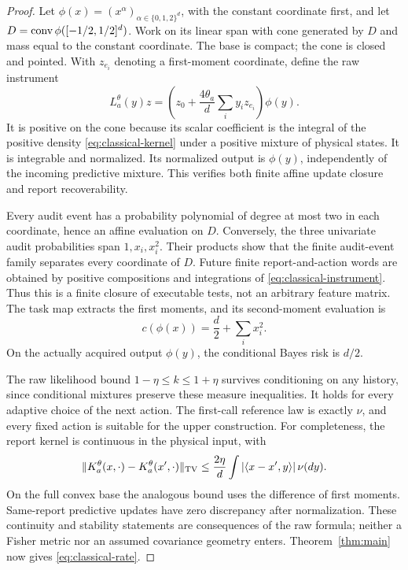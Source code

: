 \begin{proof}
Let $\phi(x)=(x^\alpha)_{\alpha\in\{0,1,2\}^d}$, with the constant coordinate first, and let $D=\operatorname{conv}\phi([-1/2,1/2]^d)$. Work on its linear span with cone generated by $D$ and mass equal to the constant coordinate. The base is compact; the cone is closed and pointed. With $z_{e_i}$ denoting a first-moment coordinate, define the raw instrument
\begin{equation}\label{eq:classical-instrument}
 L_a^\theta(y)z=
   \left(z_0+\frac{4\theta_a}{d}\sum_i y_i z_{e_i}\right)\phi(y).
\end{equation}
It is positive on the cone because its scalar coefficient is the integral of the positive density \eqref{eq:classical-kernel} under a positive mixture of physical states. It is integrable and normalized. Its normalized output is $\phi(y)$, independently of the incoming predictive mixture. This verifies both finite affine update closure and report recoverability.

Every audit event has a probability polynomial of degree at most two in each coordinate, hence an affine evaluation on $D$. Conversely, the three univariate audit probabilities span $1,x_i,x_i^2$. Their products show that the finite audit-event family separates every coordinate of $D$. Future finite report-and-action words are obtained by positive compositions and integrations of \eqref{eq:classical-instrument}. Thus this is a finite closure of executable tests, not an arbitrary feature matrix. The task map extracts the first moments, and its second-moment evaluation is
\[
 c(\phi(x))=\frac d2+\sum_i x_i^2.
\]
On the actually acquired output $\phi(y)$, the conditional Bayes risk is $d/2$.

The raw likelihood bound $1-\eta\le k\le1+\eta$ survives conditioning on any history, since conditional mixtures preserve these measure inequalities. It holds for every adaptive choice of the next action. The first-call reference law is exactly $\nu$, and every fixed action is suitable for the upper construction. For completeness, the report kernel is continuous in the physical input, with
\[
 \lVert K_a^\theta(x,\cdot)-K_a^\theta(x',\cdot)\rVert_{\mathrm{TV}}
 \le\frac{2\eta}{d}\int|\langle x-x',y\rangle|\,\nu(dy).
\]
On the full convex base the analogous bound uses the difference of first moments. Same-report predictive updates have zero discrepancy after normalization. These continuity and stability statements are consequences of the raw formula; neither a Fisher metric nor an assumed covariance geometry enters. Theorem~\ref{thm:main} now gives \eqref{eq:classical-rate}.
\end{proof}

